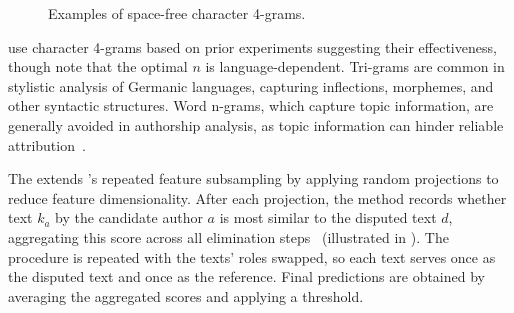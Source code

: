 \begin{figure}[ht]
    \centering
    \caption[Examples of space-free character 4-grams]{Examples of space-free character 4-grams.}
    \label{fig:spacefree_4gram}
\end{figure}

\citet{koppel_determining_2014} use character 4-grams based on prior experiments suggesting their effectiveness, though \citet{neal_surveying_2018} note that the optimal $n$ is language-dependent. 
Tri-grams are common in stylistic analysis of Germanic languages, capturing inflections, %
morphemes, %
and other syntactic structures. 
Word n-grams, which capture topic information, are generally avoided in authorship analysis, as topic information can hinder reliable attribution~\citep{neal_surveying_2018,Sapkota_ngrams_2015}.

The \impAppr{} extends \unmasking{}'s repeated feature subsampling \citep{koppel_authorship_2004} by applying random projections to reduce feature dimensionality.
After each projection, the method records whether text $k_a$ by the candidate author $a$ is most similar to the disputed text $d$, aggregating this score across all elimination steps~\citep{tyo_state_2022} (illustrated in ). 
The procedure is repeated with the texts' roles swapped, so each text serves once as the disputed text and once as the reference. 
Final predictions are obtained by averaging the aggregated scores and applying a threshold.

